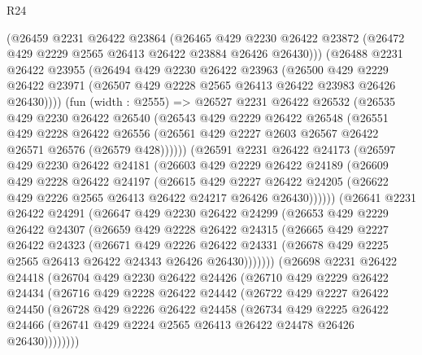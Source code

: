 \begin{lexlean}{R24}
\begin{coremodule}
    (@26459
      @2231
      @26422
      @23864
      (@26465
        @429
        @2230
        @26422
        @23872
        (@26472 @429 @2229 @2565 @26413 @26422 @23884 @26426 @26430)))
    (@26488
      @2231
      @26422
      @23955
      (@26494
        @429
        @2230
        @26422
        @23963
        (@26500
          @429
          @2229
          @26422
          @23971
          (@26507 @429 @2228 @2565 @26413 @26422 @23983 @26426 @26430))))
    (fun (width : @2555) =>
    @26527
      @2231
      @26422
      @26532
      (@26535
        @429
        @2230
        @26422
        @26540
        (@26543
          @429
          @2229
          @26422
          @26548
          (@26551
            @429
            @2228
            @26422
            @26556
            (@26561 @429 @2227 @2603 @26567 @26422 @26571 @26576 (@26579 @428))))))
    (@26591
      @2231
      @26422
      @24173
      (@26597
        @429
        @2230
        @26422
        @24181
        (@26603
          @429
          @2229
          @26422
          @24189
          (@26609
            @429
            @2228
            @26422
            @24197
            (@26615
              @429
              @2227
              @26422
              @24205
              (@26622 @429 @2226 @2565 @26413 @26422 @24217 @26426 @26430))))))
    (@26641
      @2231
      @26422
      @24291
      (@26647
        @429
        @2230
        @26422
        @24299
        (@26653
          @429
          @2229
          @26422
          @24307
          (@26659
            @429
            @2228
            @26422
            @24315
            (@26665
              @429
              @2227
              @26422
              @24323
              (@26671
                @429
                @2226
                @26422
                @24331
                (@26678 @429 @2225 @2565 @26413 @26422 @24343 @26426 @26430)))))))
    (@26698
      @2231
      @26422
      @24418
      (@26704
        @429
        @2230
        @26422
        @24426
        (@26710
          @429
          @2229
          @26422
          @24434
          (@26716
            @429
            @2228
            @26422
            @24442
            (@26722
              @429
              @2227
              @26422
              @24450
              (@26728
                @429
                @2226
                @26422
                @24458
                (@26734
                  @429
                  @2225
                  @26422
                  @24466
                  (@26741 @429 @2224 @2565 @26413 @26422 @24478 @26426 @26430))))))))

\end{coremodule}
\end{lexlean}
